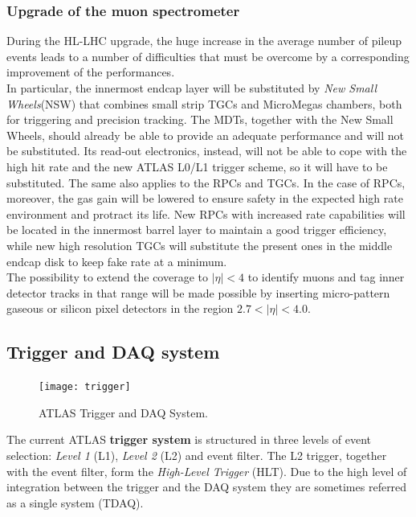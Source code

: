 \documentclass[a4paper,twoside,12pt]{article}
\begin{document}
\subsubsection*{Upgrade of the muon spectrometer}\cite{scoping}
During the HL-LHC upgrade, the huge increase in the average number of pileup events leads to a number of difficulties that must be overcome by a corresponding improvement of the performances.\\

In particular, the innermost endcap layer will be substituted by \textit{New Small Wheels}(NSW) that combines small strip TGCs and MicroMegas chambers, both for triggering and 
precision tracking. The MDTs, together with the New Small Wheels, should already be able to provide an adequate performance and will not be substituted. Its read-out electronics, instead, will not 
be able to cope with the high hit rate and the new ATLAS L0/L1 trigger scheme, so it will have to be substituted. The same also applies to the RPCs and TGCs. In the case of RPCs, moreover,
the gas gain will be lowered to ensure safety in the expected high rate environment and protract its life. New RPCs with increased rate capabilities will be located in the innermost barrel layer to maintain a
good trigger efficiency, while new high resolution TGCs will substitute the present ones in the middle endcap disk to keep fake rate at a minimum.\\

The possibility to extend the coverage to $|\eta| < 4$ to identify muons and tag inner detector tracks in that range will be made possible by inserting micro-pattern gaseous or silicon pixel
detectors in the region $2.7 < |\eta| < 4.0$.

\subsection{Trigger and DAQ system}

\begin{figure} [h]
	\centering
	\texttt{[image: trigger]}
	\caption{ATLAS Trigger and DAQ System\cite{Green:2010zza}.}
	\label{fig:trigger}
\end{figure}

The current ATLAS \textbf{trigger system} is structured in three levels of event selection: \textit{Level 1} (L1), \textit{Level 2} (L2) and event filter\cite{Aad:2008zzm}. The L2 trigger, together
with the event filter, form the \textit{High-Level Trigger} (HLT). Due to the high level of integration between the trigger and the DAQ system they are sometimes referred as a single system (TDAQ).\\
\end{document}
